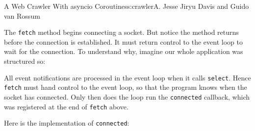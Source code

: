 \begin{aosachapter}{A Web Crawler With asyncio Coroutines}{s:crawler}{A. Jesse Jiryu Davis and Guido van Rossum}
\begin{Shaded}
\begin{Highlighting}[]
\end{Highlighting}
\end{Shaded}

The \texttt{fetch} method begins connecting a socket. But notice the
method returns before the connection is established. It must return
control to the event loop to wait for the connection. To understand why,
imagine our whole application was structured so:

\begin{Shaded}
\begin{Highlighting}[]
\NormalTok{)}

 \NormalTok{:}
     
\end{Highlighting}
\end{Shaded}

All event notifications are processed in the event loop when it calls
\texttt{select}. Hence \texttt{fetch} must hand control to the event
loop, so that the program knows when the socket has connected. Only then
does the loop run the \texttt{connected} callback, which was registered
at the end of \texttt{fetch} above.

Here is the implementation of \texttt{connected}:

\begin{Shaded}
\begin{Highlighting}[]
     
        \NormalTok{(}\NormalTok{)}
        \NormalTok{))}
        

\end{Highlighting}
\end{Shaded}
\end{aosachapter}
